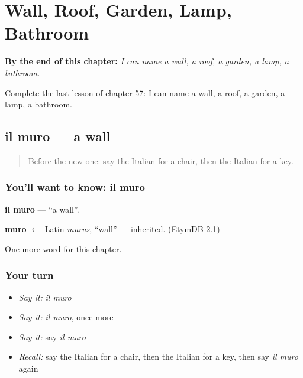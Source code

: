
\chapter{Wall, Roof, Garden, Lamp, Bathroom}
\label{ch:it-wall-roof-garden-lamp-bathroom}

\begin{chapteropening}
\textbf{By the end of this chapter:} \emph{I can name a wall, a roof, a garden, a lamp, a bathroom.}

Complete the last lesson of chapter 57: I can name a wall, a roof, a garden, a lamp, a bathroom.
\end{chapteropening}

\section[il muro]{il muro — a wall}

\label{lesson:IT-C57-muro}



\begin{quote}
Before the new one: say the Italian for a chair, then the Italian for a key.
\end{quote}

\subsection*{You'll want to know: il muro}
\textbf{il muro} — \textquotedblleft{}a wall\textquotedblright{}.

\begin{cousinweb}
\textbf{muro} $\leftarrow$ Latin \emph{murus}, \textquotedblleft{}wall\textquotedblright{} — inherited. (EtymDB 2.1)
\end{cousinweb}

\begin{grammarlens}[title={What you've built}]
One more word for this chapter.
\end{grammarlens}

\subsection*{Your turn}
\begin{itemize}
\raggedright
  \item \emph{Say it:} \emph{il muro}
  \item \emph{Say it:} \emph{il muro}, once more
  \item \emph{Say it:} say \emph{il muro}
  \item \emph{Recall:} say the Italian for a chair, then the Italian for a key, then say \emph{il muro} again
\end{itemize}

